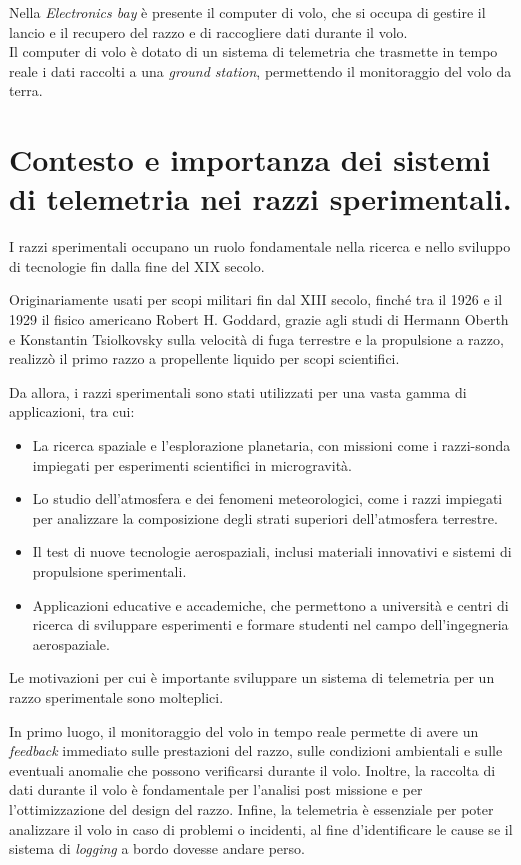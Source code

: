 \documentclass[12pt,a4paper,twoside]{book}
\begin{document}
Nella \emph{Electronics bay} è presente il computer di volo, che si occupa di 
gestire il lancio e il recupero del razzo e di raccogliere dati durante il volo. \\
Il computer di volo è dotato di un sistema di telemetria che trasmette in tempo 
reale i dati raccolti a una \emph{ground station}, permettendo il monitoraggio 
del volo da terra.

\section{Contesto e importanza dei sistemi di telemetria nei razzi sperimentali.}
I razzi sperimentali occupano un ruolo fondamentale nella ricerca e nello 
sviluppo di tecnologie fin dalla fine del XIX secolo.

Originariamente usati per scopi militari fin dal XIII secolo, finch\'e tra il 
1926 e il 1929 il fisico americano Robert H. Goddard, grazie agli studi di 
Hermann Oberth e Konstantin Tsiolkovsky sulla velocità di fuga terrestre e la 
propulsione a razzo, realizz\`o il primo razzo a propellente liquido per scopi 
scientifici\cite{seibert2006history}.

Da allora, i razzi sperimentali sono stati utilizzati per una vasta gamma di 
applicazioni, tra cui:
\begin{itemize}
    \item La ricerca spaziale e l’esplorazione planetaria, con missioni come 
    i razzi-sonda impiegati per esperimenti scientifici in microgravità.
    \item Lo studio dell’atmosfera e dei fenomeni meteorologici, come i razzi 
    impiegati per analizzare la composizione degli strati superiori 
    dell’atmosfera terrestre.
    \item Il test di nuove tecnologie aerospaziali, inclusi materiali innovativi
     e sistemi di propulsione sperimentali.
    \item Applicazioni educative e accademiche, che permettono a università e 
    centri di ricerca di sviluppare esperimenti e formare studenti nel campo 
    dell’ingegneria aerospaziale.
\end{itemize}

Le motivazioni per cui \`e importante sviluppare un sistema di telemetria per un 
razzo sperimentale sono molteplici.

In primo luogo, il monitoraggio del volo in tempo reale permette di avere un 
\emph{feedback} immediato sulle prestazioni del razzo, sulle condizioni 
ambientali e sulle eventuali anomalie che possono verificarsi durante il volo.
Inoltre, la raccolta di dati durante il volo \`e fondamentale per l’analisi 
post missione e per l’ottimizzazione del design del razzo.
Infine, la telemetria \`e essenziale per poter analizzare il volo in caso di 
problemi o incidenti, al fine d'identificare le cause se il sistema di 
\emph{logging} a bordo dovesse andare perso.
\end{document}
